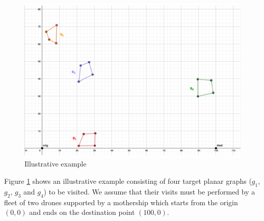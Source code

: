 \noindent



\begin{figure}[h]
\centering
\includegraphics[width = 0.5\linewidth]{figures/example_new.pdf}
\caption{Illustrative example \label{fig:example1}}
\end{figure}

\noindent
Figure \ref{fig:example1} shows an illustrative example consisting of four target planar graphs ($g_1$, $g_2$, $g_3$ and $g_4$) to be visited. We assume that their visits must be performed by a fleet of two drones supported by a mothership which starts from the origin $(0,0)$ and ends on the destination point $(100,0)$.



